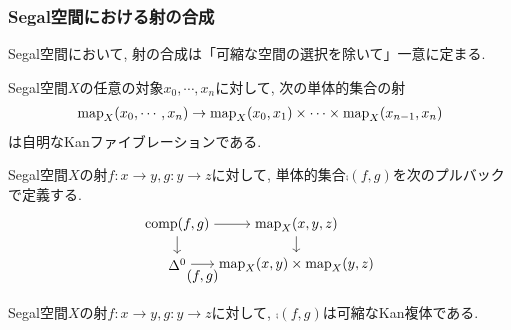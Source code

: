 \documentclass[aspectratio=169, dvipdfmx, 8pt, notheorems, uplatex]{beamer}
\begin{document}
\begin{frame}
  \frametitle{Segal空間における射の合成}

  Segal空間において, 射の合成は「可縮な空間の選択を除いて」一意に定まる. 

  \begin{lemma}
    Segal空間$X$の任意の対象$x_0,\cdots,x_n$に対して, 次の単体的集合の射
    \begin{align*}
      \mathrm{map}_X(x_0,\cdots,x_n) \to \mathrm{map}_X(x_0,x_1) \times \cdots \times \mathrm{map}_X(x_{n-1},x_n)
    \end{align*}
    は自明なKanファイブレーションである. 
  \end{lemma}

  \begin{definition}
    Segal空間$X$の射$f : x \to y, g : y \to z$に対して, 単体的集合$\comp(f,g)$を次のプルバックで定義する. 
    \[
    \begin{tikzpicture}[->]
      \node (downleft) at (0,0) {$\Delta^0$};
      \node (downright) at (3,0) {$\map_X(x,y) \times \map_X(y,z)$};
      \node (upleft) at (0,1) {$\comp(f,g)$};
      \node (upright) at (3,1) {$\map_X(x,y,z)$};
      \draw (downleft) -- node[below] {$(f,g)$} (downright);
      \draw (upleft) -- (downleft);
      \draw (upleft) -- (upright);
      \draw (upright) -- (downright);
    \end{tikzpicture}  
    \]
  \end{definition}

  \begin{remark}
    Segal空間$X$の射$f : x \to y, g : y \to z$に対して, $\comp(f,g)$は可縮なKan複体である.
  \end{remark}

\end{frame}
\end{document}
